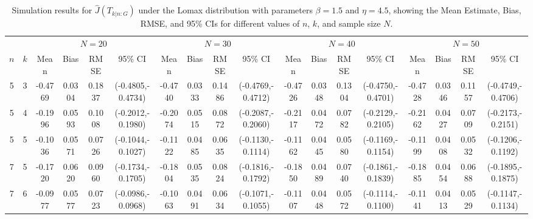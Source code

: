 \documentclass[12pt,a4paper]{article}
\numberwithin{equation}{section}
\begin{document}
\begin{table}
\centering
\caption{Simulation results for $\widehat J(T_{k|n:G})$ under the Lomax distribution with parameters $\beta=1.5$ and $\eta=4.5$, showing the Mean Estimate, Bias, RMSE, and 95\% CIs for different values of $n$, $k$, and sample size $N$.}
\label{tab3}

\renewcommand{\arraystretch}{1.5}
\setlength{\tabcolsep}{3pt}

\scriptsize

\begin{tabular}{cccccccccccccccccc}
\toprule

& &
\multicolumn{4}{c}{$N=20$} &
\multicolumn{4}{c}{$N=30$} &
\multicolumn{4}{c}{$N=40$} &
\multicolumn{4}{c}{$N=50$} \\

\cmidrule(lr){3-6}
\cmidrule(lr){7-10}
\cmidrule(lr){11-14}
\cmidrule(lr){15-18}

$n$ & $k$
& Mean & Bias & RMSE & 95\% CI
& Mean & Bias & RMSE & 95\% CI
& Mean & Bias & RMSE & 95\% CI
& Mean & Bias & RMSE & 95\% CI \\

\midrule

5 & 3
& -0.4769 & 0.0304 & 0.1837 & (-0.4805,-0.4734)
& -0.4740 & 0.0333 & 0.1486 & (-0.4769,-0.4712)
& -0.4726 & 0.0348 & 0.1304 & (-0.4750,-0.4701)
& -0.4728 & 0.0346 & 0.1157 & (-0.4749,-0.4706) \\

5 & 4
& -0.1996 & 0.0593 & 0.1008 & (-0.2012,-0.1980)
& -0.2074 & 0.0515 & 0.0872 & (-0.2087,-0.2060)
& -0.2117 & 0.0472 & 0.0782 & (-0.2129,-0.2105)
& -0.2162 & 0.0427 & 0.0709 & (-0.2173,-0.2151) \\

5 & 5
& -0.1036 & 0.0571 & 0.0726 & (-0.1044,-0.1027)
& -0.1122 & 0.0485 & 0.0635 & (-0.1130,-0.1114)
& -0.1162 & 0.0445 & 0.0580 & (-0.1169,-0.1154)
& -0.1199 & 0.0408 & 0.0532 & (-0.1206,-0.1192) \\

\midrule

7 & 5
& -0.1720 & 0.0620 & 0.0960 & (-0.1734,-0.1705)
& -0.1804 & 0.0535 & 0.0824 & (-0.1816,-0.1792)
& -0.1850 & 0.0489 & 0.0740 & (-0.1861,-0.1839)
& -0.1885 & 0.0454 & 0.0688 & (-0.1895,-0.1875) \\

7 & 6
& -0.0977 & 0.0577 & 0.0723 & (-0.0986,-0.0968)
& -0.1063 & 0.0491 & 0.0634 & (-0.1071,-0.1055)
& -0.1107 & 0.0448 & 0.0572 & (-0.1114,-0.1100)
& -0.1141 & 0.0413 & 0.0529 & (-0.1147,-0.1134) \\


\end{tabular}
\end{table}
\end{document}
